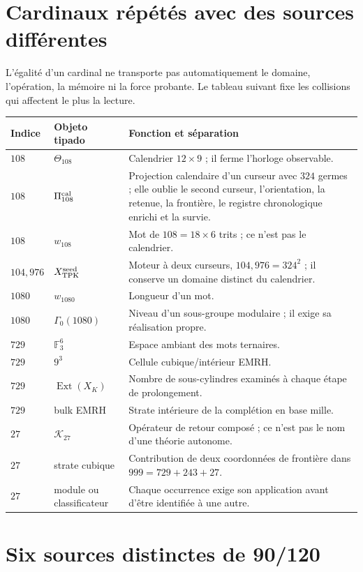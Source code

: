 \section*{Cardinaux répétés avec des sources différentes}

L'égalité d'un cardinal ne transporte pas automatiquement le domaine,
l'opération, la mémoire ni la force probante. Le tableau suivant fixe les
collisions qui affectent le plus la lecture.

\begin{longtable}{@{}p{}p{}p{}@{}}
\toprule
Indice & Objeto tipado & Fonction et séparation \\ \midrule
\endhead
\(108\)&\(\Theta_{108}\)&Calendrier \(12\times9\) ; il ferme l'horloge
observable.\\
\(108\)&\(\Pi_{108}^{\rm cal}\)&Projection calendaire d'un curseur avec \(324\)
germes ; elle oublie le second curseur, l'orientation, la retenue, la frontière, le registre
chronologique enrichi et la
survie.\\
\(108\)&\(w_{108}\)&Mot de \(108=18\times6\) trits ; ce n'est pas le calendrier.\\
\(104,976\)&\(X_{\rm TPK}^{\rm seed}\)&Moteur à deux curseurs,
\(104,976=324^2\) ; il conserve un domaine distinct du calendrier.\\
\(1080\)&\(w_{1080}\)&Longueur d'un mot.\\
\(1080\)&\(\Gamma_0(1080)\)&Niveau d'un sous-groupe modulaire ; il exige sa
réalisation propre.\\
\(729\)&\(\mathbb F_3^6\)&Espace ambiant des mots ternaires.\\
\(729\)&\(9^3\)&Cellule cubique/intérieur EMRH.\\
\(729\)&\(\operatorname{Ext}(X_K)\)&Nombre de sous-cylindres examinés à chaque
étape de prolongement.\\
\(729\)&bulk EMRH&Strate intérieure de la complétion en base mille.\\
\(27\)&\(\mathcal K_{27}\)&Opérateur de retour composé ; ce n'est pas le nom d'une
théorie autonome.\\
\(27\)&strate cubique&Contribution de deux coordonnées de frontière dans
\(999=729+243+27\).\\
\(27\)&module ou classificateur&Chaque occurrence exige son application avant
d'être identifiée à une autre.\\
\bottomrule
\end{longtable}

\section*{Six sources distinctes de 90/120}

